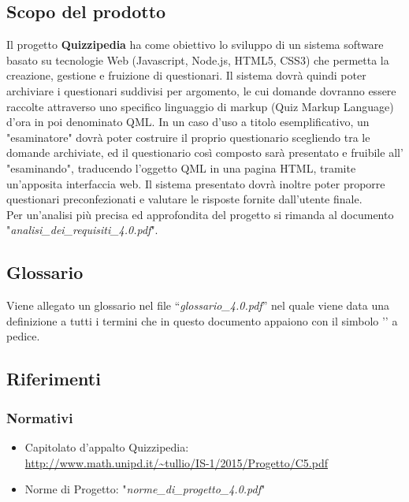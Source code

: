 \documentclass[a4paper,11pt]{article}
\begin{document}
	
	\subsection{Scopo del prodotto}
	Il progetto \textbf{Quizzipedia} ha come obiettivo lo sviluppo di un sistema software basato su tecnologie Web (Javascript\addglos, Node.js\addglos, HTML5\addglos, CSS3\addglos) che permetta la creazione, gestione e fruizione di questionari. Il sistema dovrà quindi poter archiviare i questionari suddivisi per argomento, le cui domande dovranno essere raccolte attraverso uno specifico linguaggio di markup (Quiz Markup Language) d'ora in poi denominato QML\addglos. In un caso d'uso a titolo esemplificativo, un "esaminatore" dovrà poter costruire il proprio questionario scegliendo tra le domande archiviate, ed il questionario così composto sarà presentato e fruibile all' "esaminando", traducendo l'oggetto QML in una pagina HTML\addglos, tramite un'apposita interfaccia web. Il sistema presentato dovrà inoltre poter proporre questionari preconfezionati e valutare le risposte fornite dall'utente finale.
	\\
	Per un'analisi più precisa ed approfondita del progetto si rimanda al documento\\ "\textit{analisi\_dei\_requisiti\_4.0.pdf}".
	\subsection{Glossario}
	Viene allegato un glossario nel file ``\textit{glossario\_4.0.pdf}'' nel quale viene data una definizione a tutti i termini che in questo documento appaiono con il simbolo '\addglos' a pedice.
	\newpage
	\subsection{Riferimenti}
		\subsubsection{Normativi}
		\begin{itemize}
			\item Capitolato d'appalto Quizzipedia:\\
			\url{http://www.math.unipd.it/~tullio/IS-1/2015/Progetto/C5.pdf}
			\item Norme di Progetto: "\textit{norme\_di\_progetto\_4.0.pdf}"
		\end{itemize}
\end{document}
